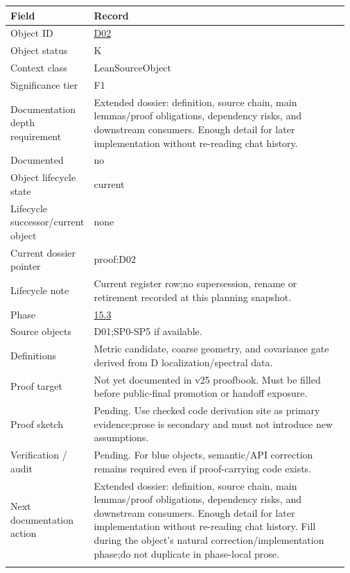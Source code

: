 \begin{longtable}{L{0.16\linewidth} L{0.81\linewidth}}
\hline
\textbf{Field} & \textbf{Record}\\
\hline
Object ID & \hyperlink{object-row-D02}{D02}\\
\hline\addlinespace[0.20em]
Object status & K\\
\hline\addlinespace[0.20em]
Context class & LeanSourceObject\\
\hline\addlinespace[0.20em]
Significance tier & F1\\
\hline\addlinespace[0.20em]
Documentation depth requirement & Extended dossier: definition, source chain, main lemmas/\allowbreak{}proof obligations, dependency risks, and downstream consumers. Enough detail for later implementation without re-reading chat history.\\
\hline\addlinespace[0.20em]
Documented & no\\
\hline\addlinespace[0.20em]
Object lifecycle state & current\\
\hline\addlinespace[0.20em]
Lifecycle successor/\allowbreak{}current object & none\\
\hline\addlinespace[0.20em]
Current dossier pointer & proof:D02\\
\hline\addlinespace[0.20em]
Lifecycle note & Current register row;\newline no supersession, rename or retirement recorded at this planning snapshot.\\
\hline\addlinespace[0.20em]
Phase & \hyperlink{phase-row-15-3}{15.3}\\
\hline\addlinespace[0.20em]
Source objects & D01;\newline SP0-SP5 if available.\\
\hline\addlinespace[0.20em]
Definitions & Metric candidate, coarse geometry, and covariance gate derived from D localization/\allowbreak{}spectral data.\\
\hline\addlinespace[0.20em]
Proof target & Not yet documented in v25 proofbook. Must be filled before public-final promotion or handoff exposure.\\
\hline\addlinespace[0.20em]
Proof sketch & Pending. Use checked code derivation site as primary evidence;\newline prose is secondary and must not introduce new assumptions.\\
\hline\addlinespace[0.20em]
Verification /\allowbreak{} audit & Pending. For blue objects, semantic/\allowbreak{}API correction remains required even if proof-carrying code exists.\\
\hline\addlinespace[0.20em]
Next documentation action & Extended dossier: definition, source chain, main lemmas/\allowbreak{}proof obligations, dependency risks, and downstream consumers. Enough detail for later implementation without re-reading chat history. Fill during the object's natural correction/\allowbreak{}implementation phase;\newline do not duplicate in phase-local prose.\\
\hline\addlinespace[0.20em]
\end{longtable}

